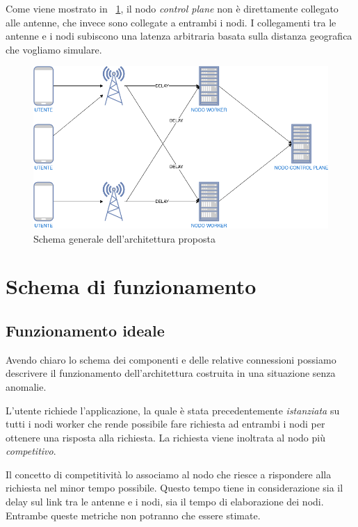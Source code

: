 \documentclass[12pt, hidelinks]{report}
\begin{document}
Come viene mostrato in \figurename~\ref{fig:schema-generale}, il nodo \textit{control plane} non è direttamente collegato alle antenne, che invece sono collegate a entrambi i nodi. I collegamenti tra le antenne e i nodi subiscono una latenza arbitraria basata sulla distanza geografica che vogliamo simulare.

\begin{figure}[h]
    \centering
    \includegraphics[width=\linewidth]{9_schema_generale.png}
    \caption{Schema generale dell'architettura proposta}
    \label{fig:schema-generale}
\end{figure}

\section{Schema di funzionamento}

\subsection{Funzionamento ideale}
Avendo chiaro lo schema dei componenti e delle relative connessioni possiamo descrivere il funzionamento dell'architettura costruita in una situazione senza anomalie.

L'utente richiede l'applicazione, la quale è stata precedentemente \textit{istanziata} su tutti i nodi worker che rende possibile fare richiesta ad entrambi i nodi per ottenere una risposta alla richiesta. La richiesta viene inoltrata al nodo più \textit{competitivo}. 

Il concetto di competitività lo associamo al nodo che riesce a rispondere alla richiesta nel minor tempo possibile. Questo tempo tiene in considerazione sia il delay sul link tra le antenne e i nodi, sia il tempo di elaborazione dei nodi. Entrambe queste metriche non potranno che essere stimate.
\end{document}
